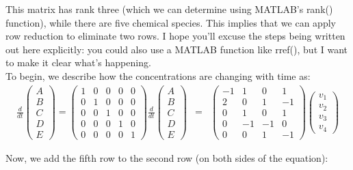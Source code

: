 \documentclass{article}
\begin{document}
This matrix has rank three (which we can determine using MATLAB's rank() function), while there are five chemical species. This implies that we can apply row reduction to eliminate two rows. I hope you'll excuse the steps being written out here explicitly: you could also use a MATLAB function like rref(), but I want to make it clear what's happening.\\

To begin, we describe how the concentrations are changing with time as:
\begin{eqnarray*}
\frac{d}{dt} \begin{pmatrix} A\\ B \\ C\\ D\\ E \end{pmatrix} = 
\begin{pmatrix} 1 & 0 & 0 & 0 & 0\\ 0 & 1 & 0 & 0 &0\\ 0 & 0 & 1 & 0 & 0\\ 0 & 0 & 0& 1 & 0\\ 0 & 0 & 0 & 0 & 1\end{pmatrix}
\frac{d}{dt} \begin{pmatrix} A\\ B \\ C\\ D\\ E \end{pmatrix} 
& = & \begin{pmatrix} -1 & 1 & 0 & 1\\
2 & 0 & 1 & -1\\
0 & 1 & 0 & 1\\
0 & -1 & -1 & 0\\
0 & 0 & 1 & -1
\end{pmatrix} \begin{pmatrix} v_1\\ v_2 \\ v_3 \\ v_4 \end{pmatrix}
\end{eqnarray*}

Now, we add the fifth row to the second row (on both sides of the equation):
\end{document}
